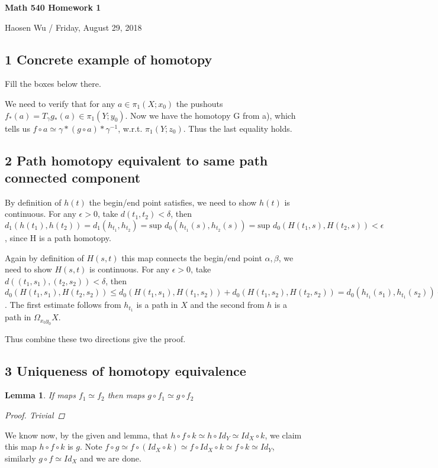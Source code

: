 \documentclass[11pt]{article}
\newtheorem{lem}{Lemma}
\theoremstyle{remark}
\begin{document}
\begin{center}
    \begin{Large} {\bf Math 540 Homework 1}\\
    \end{Large}
    Haosen Wu  / Friday, August 29, 2018
\end{center}


\subsection*{1 Concrete example of homotopy}
 Fill the boxes below there.
 
 We need to verify that for any $a \in \pi_1(X;x_0) $ the pushouts $f_*(a) = T_\gamma g_*(a) \in \pi_1(Y;y_0) $. Now we have the homotopy G from a), which tells us $f\circ a \simeq \gamma * (g \circ a) * \gamma^{-1}$, w.r.t. $\pi_1(Y;z_0)$. Thus the last equality holds.


\subsection*{2 Path homotopy equivalent to same path connected component}
  By definition of $h(t)$ the begin/end point satisfies, we need to show $h(t)$ is continuous. For any $\epsilon >0$, take $d(t_1,t_2)< \delta$, then $d_1(h(t_1),h(t_2)) = d_1(h_{t_1},h_{t_2}) = \textrm{sup } d_0(h_{t_1}(s),h_{t_2}(s))  = \textrm{sup } d_0(H(t_1,s),H(t_2,s)) <\epsilon$, since H is a path homotopy.

  Again by definition of $H(s,t)$ this map connects the begin/end point $\alpha,\beta$, we need to show $H(s,t)$ is continuous. For any $\epsilon >0$, take $d((t_1,s_1),(t_2,s_2))< \delta$, then $d_0(H(t_1,s_1),H(t_2,s_2))\leq d_0(H(t_1,s_1),H(t_1,s_2))+d_0(H(t_1,s_2),H(t_2,s_2)) = d_0(h_{t_1}(s_1),h_{t_1}(s_2)) + d_1(h_{t_1},h_{t_2}) < \epsilon + \epsilon = 2\epsilon$. The first estimate follows from $h_{t_1}$ is a path in $X$ and the second from $h$ is a path in $\Omega_{x_0 y_0}X$.

  Thus combine these two directions give the proof.
\subsection*{3 Uniqueness of homotopy equivalence}

\begin{lem}
  If maps $f_1\simeq f_2$ then maps $g\circ f_1 \simeq g\circ f_2$ 
  \begin{proof}
  Trivial
  \end{proof}
\end{lem}
  We know now, by the given and lemma, that $h\circ f\circ k \simeq h\circ Id_Y \simeq Id_X \circ k$, we claim this map $h\circ f\circ k$ is $g$. Note $f\circ g \simeq f\circ (Id_X\circ k) \simeq f\circ Id_X\circ k \simeq f\circ k \simeq Id_Y$, similarly $g\circ f \simeq Id_X$ and we are done.
\end{document}
